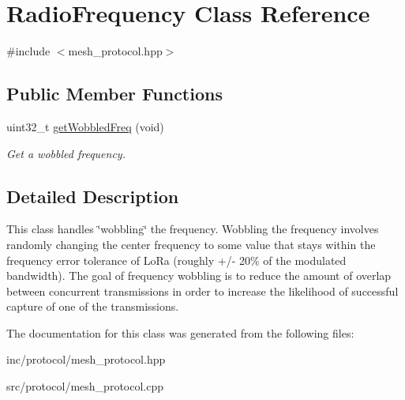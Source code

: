\hypertarget{classRadioFrequency}{}\section{Radio\+Frequency Class Reference}
\label{classRadioFrequency}


{\ttfamily \#include $<$mesh\+\_\+protocol.\+hpp$>$}

\subsection*{Public Member Functions}
\begin{DoxyCompactItemize}
\item 
\mbox{\label{classRadioFrequency_af98f36e60d90b65ef009767fc1af4d79}} 
uint32\+\_\+t \hyperlink{classRadioFrequency_af98f36e60d90b65ef009767fc1af4d79}{get\+Wobbled\+Freq} (void)
\begin{DoxyCompactList}\small\item\em Get a wobbled frequency. \end{DoxyCompactList}\end{DoxyCompactItemize}


\subsection{Detailed Description}
This class handles \char`\"{}wobbling\char`\"{} the frequency. Wobbling the frequency involves randomly changing the center frequency to some value that stays within the frequency error tolerance of Lo\+Ra (roughly +/-\/ 20\% of the modulated bandwidth). The goal of frequency wobbling is to reduce the amount of overlap between concurrent transmissions in order to increase the likelihood of successful capture of one of the transmissions. 

The documentation for this class was generated from the following files\+:\begin{DoxyCompactItemize}
\item 
inc/protocol/mesh\+\_\+protocol.\+hpp\item 
src/protocol/mesh\+\_\+protocol.\+cpp\end{DoxyCompactItemize}
